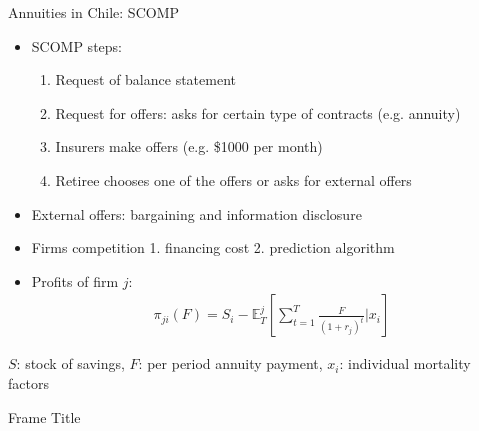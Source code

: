 \documentclass[notes, 10pt,aspectratio=169]{beamer}
\begin{document}
\begin{frame}{Annuities in Chile: SCOMP} 
    
    \begin{itemize}%
   
\end{itemize} 
    \begin{itemize}%
    \item SCOMP steps: 
    \begin{enumerate}
        \item Request of balance statement 
        \item Request for offers: asks for certain type of contracts (e.g. annuity)
        \item Insurers make offers (e.g. \$1000 per month)
        \item Retiree chooses one of the offers or asks for external offers

    \end{enumerate}

        \item External offers: bargaining and information disclosure
    

    \item Firms competition 1. financing cost 2. prediction algorithm 

    \item Profits of firm $j$: 
    \begin{align*}
    \pi_{ji}(F) = S_i-  \mathbb{E}^j_{T} \left[\sum_{t=1}^T\frac{F}{(1+r_j)^t}|x_i \right]
    \end{align*}
    \end{itemize}

     $S$: stock of savings, $F$: per period annuity payment, $x_i$: individual mortality factors
    
\end{frame}






\begin{frame}{Frame Title}
    
\end{frame}
\end{document}

